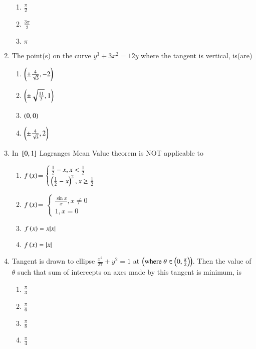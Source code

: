 \documentclass[journal]{IEEEtran}
\begin{document}
\begin{enumerate}[start=9]
\begin{multicols}{4}
\begin{enumerate}
    \item $\frac{\pi}{2}$
    \item $\frac{3\pi}{2}$
    \item $\pi$
\end{enumerate}
\end{multicols}
\item The point(s) on the curve $y^3+3x^2=12y$ where the tangent is vertical, is(are)
\hfill {}
\begin{multicols}{4}
\begin{enumerate}
    \item $\left(\pm \frac{4}{\sqrt{3}},-2\right)$
    \item $\left(\pm\sqrt{\frac{11}{3}},1\right)$
    \item $\left(0,0\right)$
    \item $\left(\pm \frac{4}{\sqrt{3}},2\right)$
\end{enumerate}
\end{multicols}
\item In ${}\left[0,1\right]$ Lagranges Mean Value theorem is NOT applicable to
\hfill {}
\begin{enumerate}
    \item $f\left(x\right)$=
    $\begin{cases}
         \frac{1}{2}-x, x<\frac{1}{2}\\
        \left(\frac{1}{2}-x\right)^2, x\geq \frac{1}{2}
    \end{cases}$
     \item $f\left(x\right)$=
    $\begin{cases}
        \frac{\sin x}{x}, x\neq 0\\
        1, x=0
    \end{cases}$
    \item $f\left(x\right)=x|x|$
    \item $f\left(x\right)= |x|$
\end{enumerate}
\item Tangent is drawn to ellipse $\frac{x^2}{27}+y^2 = 1$ at $\left(\text{where } \theta \in  \left(0,\frac{\pi}{2}\right)\right)$. Then the value of $\theta$ such that sum of intercepts on axes made by this tangent is minimum, is
\hfill {}
\begin{multicols}{4}
\begin{enumerate}
    \item $\frac{\pi}{3}$
    \item $\frac{\pi}{6}$
    \item $\frac{\pi}{8}$
    \item $\frac{\pi}{4}$
 \end{enumerate}
\end{multicols}
\end{enumerate}
\end{document}
